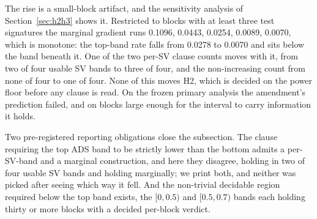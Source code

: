 \documentclass[11pt]{article}
\begin{document}
The rise is a small-block artifact, and the sensitivity analysis of
Section~\ref{sec:h2h3} shows it. Restricted to blocks with at least three test
signatures the marginal gradient runs 0.1096, 0.0443, 0.0254, 0.0089, 0.0070,
which is monotone: the top-band rate falls from 0.0278 to 0.0070 and sits
below the band beneath it. One of the two per-SV clause counts moves with it,
from two of four usable SV bands to three of four, and the non-increasing
count from none of four to one of four. None of this moves H2, which is
decided on the power floor before any clause is read. On the frozen primary
analysis the amendment's prediction failed, and on blocks large enough for the
interval to carry information it holds.

Two pre-registered reporting obligations close the subsection. The clause
requiring the top ADS band to be strictly lower than the bottom admits a
per-SV-band and a marginal construction, and here they disagree, holding in
two of four usable SV bands and holding marginally; we print both, and neither
was picked after seeing which way it fell. And the non-trivial decidable
region required below the top band exists, the $[0, 0.5)$ and $[0.5, 0.7)$
bands each holding thirty or more blocks with a decided per-block verdict.
\end{document}

